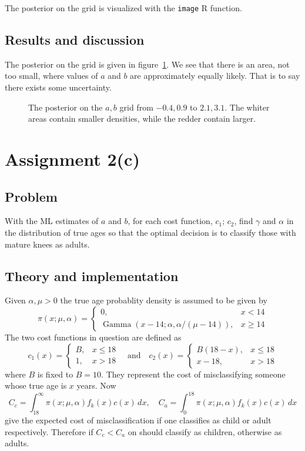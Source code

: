\documentclass[11pt, a4paper]{article}
\DeclareMathOperator{\GammaD}{Gamma}
\begin{document}
The posterior on the grid is visualized with the \texttt{image} R function.
\subsection{Results and discussion}
The posterior on the grid is given in figure~\ref{fig:posterior}.
We see that there is an area, not too small,
where values of $a$ and $b$ are approximately equally likely.
That is to say there exists some uncertainty.

\begin{figure}
	\centering
	
	\caption{The posterior on the $a, b$ grid from $-0.4, 0.9$ to $2.1, 3.1$.
		The whiter areas contain smaller densities, while the redder contain larger.
	\label{fig:posterior}}
\end{figure}

\section{Assignment 2(c)}\label{sec:optimal_decision}
\subsection{Problem}
With the ML estimates of $a$ and $b$,
for each cost function, $c_1$; $c_2$,
find $\gamma$ and $\alpha$ in the distribution of true ages so that
the optimal decision is to classify those with mature knees as adults.
\subsection{Theory and implementation}
Given $\alpha, \mu > 0$ the true age probablity density is assumed to be given by
$$ \pi(x; \mu, \alpha) = \begin{cases}
	0, & x < 14 \\
	\GammaD(x - 14; \alpha, \alpha / (\mu - 14)), & x \ge 14
\end{cases} $$
The two cost functions in question are defined as
$$ c_1(x) = \begin{cases} B, & x \le 18 \\ 1, & x > 18 \end{cases}
\quad \text{and} \quad
c_2(x) = \begin{cases} B (18 - x), & x \le 18 \\ x - 18, & x > 18 \end{cases} $$
where $B$ is fixed to $B = 10$.
They represent the cost of misclassifying someone whose true age is $x$ years.
Now
\begin{equation}\label{eq:costs}
C_c = \int_{18}^\infty \pi(x; \mu, \alpha) f_k(x) c(x) \, dx, \quad C_a = \int_0^{18} \pi(x; \mu, \alpha) f_k(x) c(x) \, dx
\end{equation}
give the expected cost of misclassification
if one classifies as child or adult respectively.
Therefore if $C_c < C_a$ on should classify as children, otherwise as adults.
\end{document}
